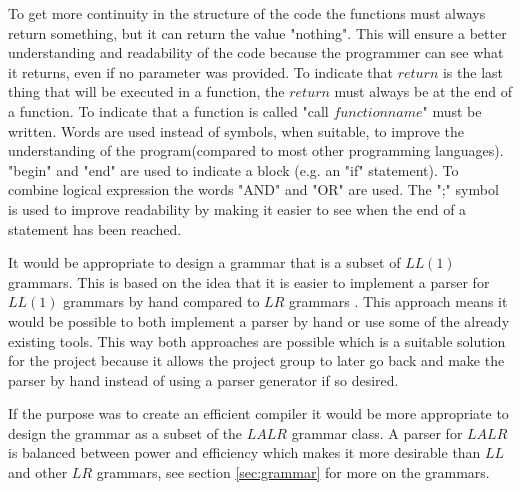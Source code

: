 To get more continuity in the structure of the code the functions must always return something, but it can return the value "nothing". This will ensure a better understanding and readability of the code because the programmer can see what it returns, even if no parameter was provided. To indicate that $return$ is the last thing that will be executed in a function, the $return$ must always be at the end of a function. To indicate that a function is called "call $functionname$" must be written.
Words are used instead of symbols, when suitable, to improve the understanding of the program(compared to most other programming languages).
"begin" and "end" are used to indicate a block (e.g. an "if" statement). To combine logical expression the words "AND" and "OR" are used. The ";" symbol is used to improve readability by making it easier to see when the end of a statement has been reached.

It would be appropriate to design a grammar that is a subset of $LL(1)$ grammars. This is based on the idea that it is easier to implement a parser for $LL(1)$ grammars by hand compared to $LR$ grammars \citep{CraftingACompiler}. This approach means it would be possible to both implement a parser by hand or use some of the already existing tools. This way both approaches are possible which is a suitable solution for the project because it allows the project group to later go back and make the parser by hand instead of using a parser generator if so desired.

If the purpose was to create an efficient compiler it would be more appropriate to design the grammar as a subset of the $LALR$ grammar class. A parser for $LALR$ is balanced between power and efficiency which makes it more desirable than $LL$ and other $LR$ grammars, see section \ref{sec:grammar} for more on the grammars. %
